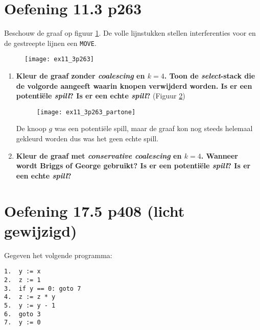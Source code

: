 \newpage
\section{Oefening 11.3 p263}
Beschouw de graaf op figuur \ref{fig:ex11_3p263}. De volle lijnstukken stellen interferenties voor en de gestreepte lijnen een \texttt{MOVE}.
\begin{figure}[ht]
	\centering
	\texttt{[image: ex11\_3p263]}
	\caption{}
	\label{fig:ex11_3p263}
\end{figure}

\begin{enumerate}
	\item \textbf{Kleur de graaf zonder \textit{coalescing} en $k = 4$. Toon de \textit{select}-stack die de volgorde aangeeft waarin knopen verwijderd worden. Is er een potentiële \textit{spill}? Is er een echte \textit{spill}?} (Figuur \ref{fig:ex11_3p263_partone})
	\begin{figure}
		\centering
		\texttt{[image: ex11\_3p263\_partone]}
		\caption{}
		\label{fig:ex11_3p263_partone}
	\end{figure}
	De knoop $g$ was een potentiële spill, maar de graaf kon nog steeds helemaal gekleurd worden dus was het geen echte spill.
	\item \textbf{Kleur de graaf met \textit{conservative coalescing} en $k = 4$. Wanneer wordt Briggs of George gebruikt?  Is er een potentiële \textit{spill}? Is er een echte \textit{spill}?}
\end{enumerate}


\newpage
\section{Oefening 17.5 p408 (licht gewijzigd)}
Gegeven het volgende programma:
\begin{lstlisting}
1.	y := x
2.  z := 1
3.  if y == 0: goto 7
4.  z := z * y
5.  y := y - 1
6.  goto 3
7.  y := 0
\end{lstlisting}

